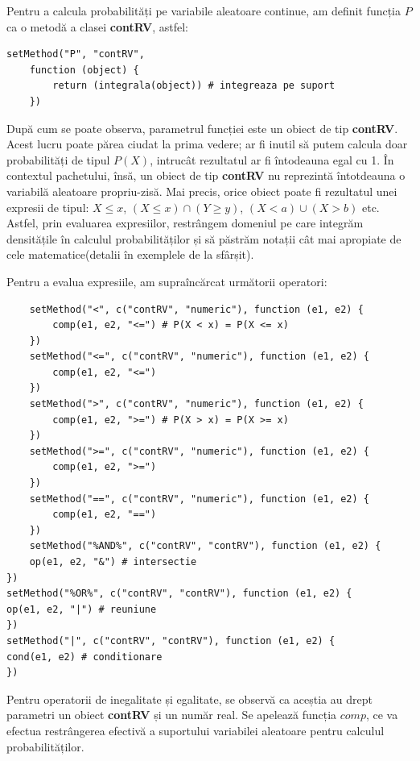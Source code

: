 \documentclass[12pt]{article}
\begin{document}
Pentru a calcula probabilități pe variabile aleatoare continue, am definit funcția $P$ ca o metodă a clasei \textbf{contRV}, astfel:
\begin{lstlisting}[numbers=none]
	setMethod("P", "contRV",
	function (object) {
		return (integrala(object)) # integreaza pe suport
	})
\end{lstlisting}

După cum se poate observa, parametrul funcției este un obiect de tip \textbf{contRV}. Acest lucru poate părea ciudat la prima vedere; ar fi inutil să putem calcula doar probabilități de tipul $P(X)$, intrucât rezultatul ar fi întodeauna egal cu 1. În contextul pachetului, însă, un obiect de tip \textbf{contRV} nu reprezintă întotdeauna o variabilă aleatoare propriu-zisă. Mai precis, orice obiect poate fi rezultatul unei expresii de tipul: $X \leq x$, $(X \leq x) \cap  (Y \geq y)$, $(X < a) \cup (X > b)$ etc. Astfel, prin evaluarea expresiilor, restrângem domeniul pe care integrăm densitățile în calculul probabilităților și să păstrăm notații cât mai apropiate de cele matematice(detalii în exemplele de la sfârșit).\par

Pentru a evalua expresiile, am supraîncărcat următorii operatori:
\begin{lstlisting}
	setMethod("<", c("contRV", "numeric"), function (e1, e2) {
		comp(e1, e2, "<=") # P(X < x) = P(X <= x)
	})
	setMethod("<=", c("contRV", "numeric"), function (e1, e2) {
		comp(e1, e2, "<=")
	})
	setMethod(">", c("contRV", "numeric"), function (e1, e2) {
		comp(e1, e2, ">=") # P(X > x) = P(X >= x)
	})
	setMethod(">=", c("contRV", "numeric"), function (e1, e2) {
		comp(e1, e2, ">=")
	})
	setMethod("==", c("contRV", "numeric"), function (e1, e2) {
		comp(e1, e2, "==")
	})
	setMethod("%AND%", c("contRV", "contRV"), function (e1, e2) {
	op(e1, e2, "&") # intersectie
})
setMethod("%OR%", c("contRV", "contRV"), function (e1, e2) {
op(e1, e2, "|") # reuniune
})
setMethod("|", c("contRV", "contRV"), function (e1, e2) {
cond(e1, e2) # conditionare
})
\end{lstlisting}\pagebreak

Pentru operatorii de inegalitate și egalitate, se observă ca aceștia au drept parametri un obiect \textbf{contRV} și un număr real. Se apelează funcția $comp$, ce va efectua restrângerea efectivă a suportului variabilei aleatoare pentru calculul probabilităților.
\end{document}
